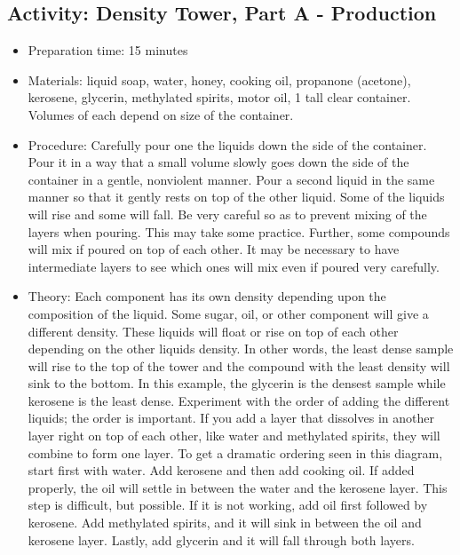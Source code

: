 \begin{itemize}
{\begin{itemize}
\subsection{Activity: Density Tower, Part A - Production}
\begin{itemize}
\item{Preparation time: 15 minutes}
\item{Materials: liquid soap, water, honey, cooking oil, propanone (acetone), kerosene, glycerin, methylated spirits, motor oil, 1 tall clear container. Volumes of each depend on size of the container.}
\item{Procedure: Carefully pour one the liquids down the side of the container. Pour it in a way that a small volume slowly goes down the side of the container in a gentle, nonviolent manner. Pour a second liquid in the same manner so that it gently rests on top of the other liquid. Some of the liquids will rise and some will fall. Be very careful so as to prevent mixing of the layers when pouring. This may take some practice. Further, some compounds will mix if poured on top of each other. It may be necessary to have intermediate layers to see which ones will mix even if poured very carefully. }
\item{Theory: Each component has its own density depending upon the composition of the liquid. Some sugar, oil, or other component will give a different density. These liquids will float or rise on top of each other depending on the other liquids density. In other words, the least dense sample will rise to the top of the tower and the compound with the least density will sink to the bottom. In this example, the glycerin is the densest sample while kerosene is the least dense. Experiment with the order of adding the different liquids; the order is important. If you add a layer that dissolves in another layer right on top of each other, like water and methylated spirits, they will combine to form one layer. To get a dramatic ordering seen in this diagram, start first with water. Add kerosene and then add cooking oil. If added properly, the oil will settle in between the water and the kerosene layer. This step is difficult, but possible. If it is not working, add oil first followed by kerosene. Add methylated spirits, and it will sink in between the oil and kerosene layer. Lastly, add glycerin and it will fall through both layers.}
\end{itemize}


\end{itemize}}
\end{itemize}
